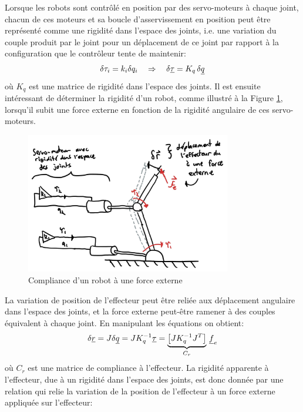 Lorsque les robots sont contrôlé en position par des servo-moteurs à chaque joint, chacun de ces moteurs et sa boucle d'asservissement en position peut être représenté comme une rigidité dans l'espace des joints, i.e. une variation du couple produit par le joint pour un déplacement de ce joint par rapport à la configuration que le contrôleur tente de maintenir:
\begin{align}
\delta \tau_i = k_i \delta q_i \quad \Rightarrow \quad \delta \underline{\tau} = K_q \, \delta \underline{q}
\end{align}
où $K_q$ est une matrice de rigidité dans l'espace des joints. Il est ensuite intéressant de déterminer la rigidité d'un robot, comme illustré à la Figure \ref{fig:robotcompliance}, lorsqu'il subit une force externe en fonction de la rigidité angulaire de ces servo-moteurs.
\begin{figure}[htbp]
	\centering
		\includegraphics[width=0.80\textwidth]{fig/robotcompliance.jpg}
	\caption{Compliance d'un robot à une force externe}
	\label{fig:robotcompliance}
\end{figure}
La variation de position de l'effecteur peut être reliée aux déplacement angulaire dans l'espace des joints, et la force externe peut-être ramener à des couples équivalent à chaque joint. En manipulant les équations on obtient:
\begin{align}
\delta \underline{r} = J \delta \underline{q} = J K_q^{-1} \underline{\tau} = 
\underbrace{
\left[ J K_q^{-1} J^T \right]
}_{C_r} \,  \underline{f}_e
\end{align}
où $C_r$ est une matrice de compliance à l'effecteur. La rigidité apparente à l'effecteur, due à un rigidité dans l'espace des joints, est donc donnée par une relation qui relie la variation de la position de l'effecteur à un force externe appliquée sur l'effecteur:
